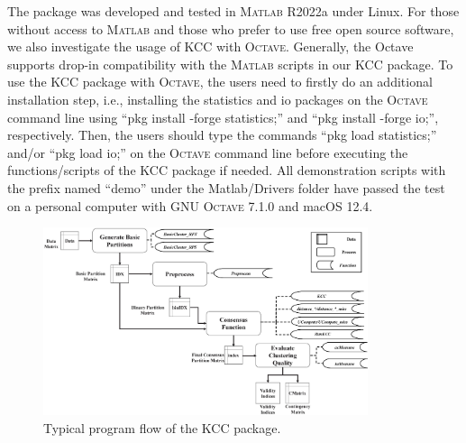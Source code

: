 \documentclass[10pt]{acmtrans2e}
\newcommand{\Matlab}{\textsc{Matlab}}
\newcommand{\Octave}{\textsc{Octave}}
\newcommand{\package}[1]{\textsf{#1}\xspace} %
\begin{document}
The package was developed and tested in \Matlab{} R2022a under Linux. For those without access to \Matlab{} and those who prefer to use free open source software, we also investigate the usage of \package{KCC} with \Octave{}. Generally, the Octave supports drop-in compatibility with the \Matlab{} scripts in our \package{KCC} package. To use the \package{KCC} package with \Octave{}, the users need to firstly do an additional installation step, i.e., installing the statistics and io packages on the \Octave{} command line using ``pkg install -forge statistics;'' and ``pkg install -forge io;'', respectively. Then, the users should type the commands ``pkg load statistics;'' and/or ``pkg load io;'' on the \Octave{} command line before executing the functions/scripts of the KCC package if needed. All demonstration scripts with the prefix named ``demo'' under the \textsf{Matlab/Drivers} folder have passed the test on a personal computer with GNU \Octave{} 7.1.0 and macOS 12.4.

\begin{figure}[!bt]
\centering
\includegraphics[width=0.85\textwidth]{fig/soft.eps}
\caption{Typical program flow of the \package{KCC} package.}\label{fig:soft} %
\end{figure}

\end{document}
